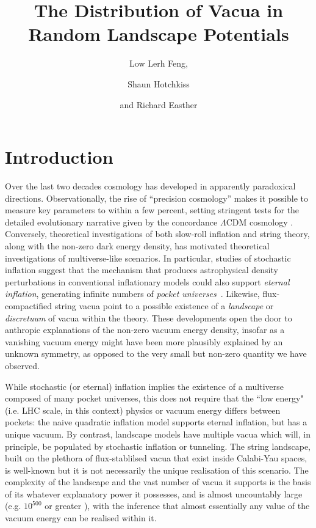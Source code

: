 \documentclass[12pt]{article}
\title{The Distribution of Vacua in Random Landscape Potentials}
\author{Low Lerh Feng,}
\author{Shaun Hotchkiss}
\author{and Richard Easther}
\affiliation{Department of Physics,\\ University of Auckland, \\Private Bag 92019,\\ Auckland, New Zealand}
\begin{document}
\maketitle

\section{Introduction}

Over the last two decades cosmology has developed in apparently paradoxical directions. Observationally, the rise of ``precision cosmology'' makes it possible to measure key parameters to within a few percent, setting stringent tests for the detailed evolutionary narrative given by the concordance $\Lambda$CDM cosmology \cite{Planck2018,DES}. Conversely, theoretical investigations of both slow-roll inflation and string theory, along with the non-zero  dark energy density, has motivated  theoretical investigations of multiverse-like scenarios. In particular, studies of stochastic inflation \cite{Linde1986,Adshead2007} suggest that the mechanism that produces astrophysical density perturbations in conventional inflationary models could also support {\em eternal inflation\/}, generating infinite numbers of  {\em pocket universes\/}~\cite{Guth2001}. Likewise, flux-compactified string vacua point to a possible existence of a  {\em landscape\/} \cite{Susskind2003} or {\em discretuum\/} \cite{Bousso2000}   of vacua within the theory. These developments open the door to anthropic explanations of the non-zero vacuum energy density, insofar as a vanishing vacuum energy might have been more plausibly explained by an unknown symmetry, as opposed to the very small but non-zero quantity we have observed. 

While stochastic (or eternal) inflation implies the existence of a multiverse composed of many pocket universes,  this does not require that the ``low energy" (i.e. LHC scale, in this context) physics or vacuum energy differs between pockets:  the naive quadratic inflation model supports eternal inflation, but has a unique vacuum.  By contrast, landscape models have multiple vacua which will, in principle, be populated by stochastic inflation or tunneling. The string landscape, built on the plethora of flux-stablilsed vacua that exist inside Calabi-Yau spaces, is well-known but it  is not necessarily the unique realisation of this scenario. The complexity of the landscape  and the vast number of vacua it supports is the basis of its whatever explanatory power it possesses, and is almost uncountably large (e.g. $10^{500}$ or greater \cite{Douglas2003}), with the inference that almost essentially any value of the vacuum energy can be realised within it. 
 
\end{document}
